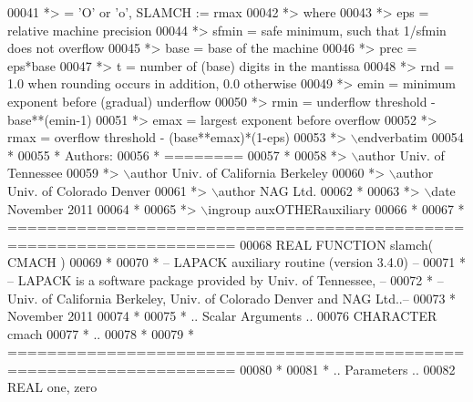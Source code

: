 \begin{DoxyCode}
00041 \textcolor{comment}{*>          = 'O' or 'o',   SLAMCH := rmax}
00042 \textcolor{comment}{*>          where}
00043 \textcolor{comment}{*>          eps   = relative machine precision}
00044 \textcolor{comment}{*>          sfmin = safe minimum, such that 1/sfmin does not overflow}
00045 \textcolor{comment}{*>          base  = base of the machine}
00046 \textcolor{comment}{*>          prec  = eps*base}
00047 \textcolor{comment}{*>          t     = number of (base) digits in the mantissa}
00048 \textcolor{comment}{*>          rnd   = 1.0 when rounding occurs in addition, 0.0 otherwise}
00049 \textcolor{comment}{*>          emin  = minimum exponent before (gradual) underflow}
00050 \textcolor{comment}{*>          rmin  = underflow threshold - base**(emin-1)}
00051 \textcolor{comment}{*>          emax  = largest exponent before overflow}
00052 \textcolor{comment}{*>          rmax  = overflow threshold  - (base**emax)*(1-eps)}
00053 \textcolor{comment}{*> \(\backslash\)endverbatim}
00054 \textcolor{comment}{*}
00055 \textcolor{comment}{*  Authors:}
00056 \textcolor{comment}{*  ========}
00057 \textcolor{comment}{*}
00058 \textcolor{comment}{*> \(\backslash\)author Univ. of Tennessee }
00059 \textcolor{comment}{*> \(\backslash\)author Univ. of California Berkeley }
00060 \textcolor{comment}{*> \(\backslash\)author Univ. of Colorado Denver }
00061 \textcolor{comment}{*> \(\backslash\)author NAG Ltd. }
00062 \textcolor{comment}{*}
00063 \textcolor{comment}{*> \(\backslash\)date November 2011}
00064 \textcolor{comment}{*}
00065 \textcolor{comment}{*> \(\backslash\)ingroup auxOTHERauxiliary}
00066 \textcolor{comment}{*}
00067 \textcolor{comment}{*  =====================================================================}
00068 \textcolor{keyword}{      REAL             }\textcolor{keyword}{FUNCTION }slamch( CMACH )
00069 \textcolor{comment}{*}
00070 \textcolor{comment}{*  -- LAPACK auxiliary routine (version 3.4.0) --}
00071 \textcolor{comment}{*  -- LAPACK is a software package provided by Univ. of Tennessee,    --}
00072 \textcolor{comment}{*  -- Univ. of California Berkeley, Univ. of Colorado Denver and NAG Ltd..--}
00073 \textcolor{comment}{*     November 2011}
00074 \textcolor{comment}{*}
00075 \textcolor{comment}{*     .. Scalar Arguments ..}
00076       \textcolor{keywordtype}{CHARACTER}          cmach
00077 \textcolor{comment}{*     ..}
00078 \textcolor{comment}{*}
00079 \textcolor{comment}{* =====================================================================}
00080 \textcolor{comment}{*}
00081 \textcolor{comment}{*     .. Parameters ..}
00082       \textcolor{keywordtype}{REAL}               one, zero

\end{DoxyCode}
